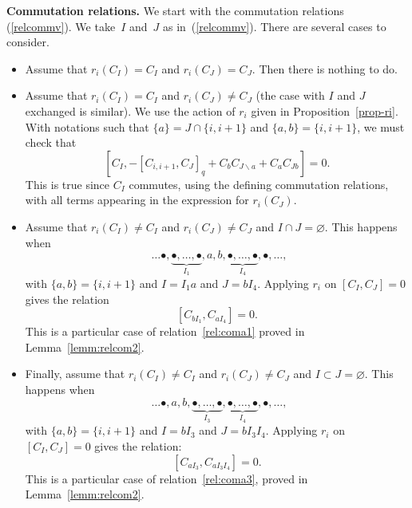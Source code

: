\documentclass[10pt,a4paper]{amsart}
\numberwithin{equation}{section}
\theoremstyle{definition}
\begin{document}
{\bf Commutation relations.} We start with the commutation relations (\ref{relcommv}). We take~$I$ and~$J$ as in~(\ref{relcommv}). There are several cases to consider.
\begin{itemize}\itemsep=0pt
\item Assume that $r_i(C_I)=C_I$ and $r_i(C_J)=C_J$. Then there is nothing to do.

\item Assume that $r_i(C_I)=C_I$ and $r_i(C_J)\neq C_J$ (the case with $I$ and $J$ exchanged is similar). We use the action of $r_i$ given in Proposition~\ref{prop-ri}. With notations such that $\{a\}=J\cap \{i,i+1\}$ and $\{a,b\}=\{i,i+1\}$, we must check that
\[[C_I, -[C_{i,i+1},C_{J}]_q+C_bC_{J\backslash a}+C_{a}C_{Jb}]=0 .\]
This is true since $C_I$ commutes, using the defining commutation relations, with all terms appearing in the expression for $r_i(C_J)$.

\item Assume that $r_i(C_I)\neq C_I$ and $r_i(C_J)\neq C_J$ and $I\cap J=\varnothing$. This happens when
\[\ \ \ldots \bullet,\underbrace{\bullet,\dots,\bullet}_{I_1},a,b,\underbrace{\bullet,\dots,\bullet}_{I_4},\bullet,\ldots ,\]
with $\{a,b\}=\{i,i+1\}$ and $I=I_1a$ and $J=bI_4$. Applying $r_i$ on $[C_I,C_J]=0$ gives the relation
\[[C_{bI_1},C_{aI_4}]=0 .\]
This is a particular case of relation~\eqref{rel:coma1} proved in Lemma~\ref{lemm:relcom2}.

\item Finally, assume that $r_i(C_I)\neq C_I$ and $r_i(C_J)\neq C_J$ and $I\subset J=\varnothing$. This happens when
\[\ \ \ldots \bullet,a,b,\underbrace{\bullet,\dots,\bullet}_{I_3},\underbrace{\bullet,\dots,\bullet}_{I_4},\bullet,\ldots ,\]
with $\{a,b\}=\{i,i+1\}$ and $I=bI_3$ and $J=bI_3I_4$. Applying $r_i$ on $[C_I,C_J]=0$ gives the relation:
\[[C_{aI_3},C_{aI_3I_4}]=0 .\]
This is a particular case of relation~\eqref{rel:coma3}, proved in Lemma~\ref{lemm:relcom2}.
\end{itemize}
\end{document}
